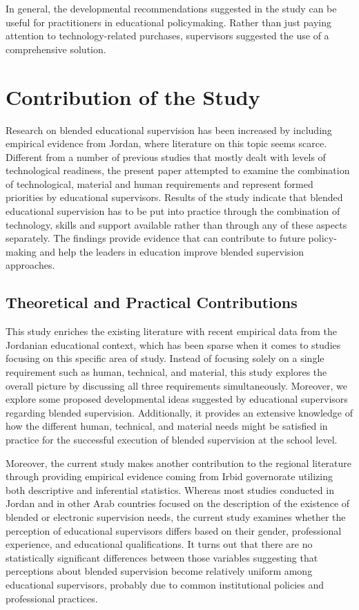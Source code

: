 \documentclass[10pt]{NSP1}
\begin{document}
\noindent In general, the developmental recommendations suggested in the study can be useful for practitioners in educational policymaking. Rather than just paying attention to technology-related purchases, supervisors suggested the use of a comprehensive solution.

\section{Contribution of the Study}

Research on blended educational supervision has been increased by including empirical evidence from Jordan, where literature on this topic seems scarce. Different from a number of previous studies that mostly dealt with levels of technological readiness, the present paper attempted to examine the combination of technological, material and human requirements and represent formed priorities by educational supervisors. Results of the study indicate that blended educational supervision has to be put into practice through the combination of technology, skills and support available rather than through any of these aspects separately. The findings provide evidence that can contribute to future policy-making and help the leaders in education improve blended supervision approaches.

\subsection{Theoretical and Practical Contributions}

This study enriches the existing literature with recent empirical data from the Jordanian educational context, which has been sparse when it comes to studies focusing on this specific area of study. Instead of focusing solely on a single requirement such as human, technical, and material, this study explores the overall picture by discussing all three requirements simultaneously. Moreover, we explore some proposed developmental ideas suggested by educational supervisors regarding blended supervision. Additionally, it provides an extensive knowledge of how the different human, technical, and material needs might be satisfied in practice for the successful execution of blended supervision at the school level.

Moreover, the current study makes another contribution to the regional literature through providing empirical evidence coming from Irbid governorate utilizing both descriptive and inferential statistics. Whereas most studies conducted in Jordan and in other Arab countries focused on the description of the existence of blended or electronic supervision needs, the current study examines whether the perception of educational supervisors differs based on their gender, professional experience, and educational qualifications. It turns out that there are no statistically significant differences between those variables suggesting that perceptions about blended supervision become relatively uniform among educational supervisors, probably due to common institutional policies and professional practices.
\end{document}
